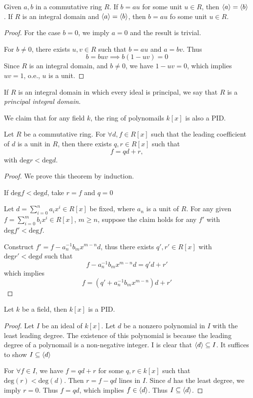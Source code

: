 \begin{proposition}
Given $a,b$ in a commutative ring $R$. If $b=au$ for some unit $u\in R$, then $\langle a\rangle=\langle b\rangle$. If $R$ is an integral domain and $\langle a\rangle=\langle b\rangle$, then $b=au$ fo some unit $u\in R$. 
\end{proposition}
\begin{proof}
For the case $b=0$, we imply $a=0$ and the result is trivial.

For $b\ne0$, there exists $u,v\in R$ such that $b=au$ and $a=bv$. Thus
\[
b=buv\implies b(1-uv)=0
\]
Since $R$ is an integral domain, and $b\ne0$, we have $1-uv=0$, which implies $uv=1$, o.e., $u$ is a unit.
\end{proof}

\begin{definition}[PID]
If $R$ is an integral domain in which every ideal is principal, we say that $R$ is a \emph{principal integral domain}.
\end{definition}
We claim that for any field $k$, the ring of polynomails $k[x]$ is also a PID.
\begin{proposition}
Let $R$ be a commutative ring. For $\forall d,f\in R[x]$ such that the leading coefficient of $d$ is a unit in $R$, then there exists $q,r\in R[x]$ such that
\[
f=qd+r,
\]
with $\mbox{deg} r<\mbox{deg} d$.
\end{proposition}
\begin{proof}
We prove this theorem by induction.

If $\mbox{deg} f<\mbox{deg} d$, take $r=f$ and $q=0$

Let $d=\sum_{i=0}^na_ix^i\in R[x]$ be fixed, where $a_n$ is a unit of $R$. For any given $f=\sum_{i=0}^mb_ix^i\in R[x]$, $m\ge n$, suppose the claim holds for any $f'$ with $\mbox{deg}f'<\mbox{deg}f$.

Construct $f'=f - a_n^{-1}b_mx^{m-n}d$, thus there exists $q',r'\in R[x]$ with $\mbox{deg}r'<\mbox{deg}d$ such that
\[
f - a_n^{-1}b_mx^{m-n}d = q'd+r'
\]
which implies 
\[
f = (q'+a_n^{-1}b_mx^{m-n})d+r'
\]
\end{proof}
\begin{theorem}
Let $k$ be a field, then $k[x]$ is a PID.
\end{theorem}
\begin{proof}
Let $I$ be an ideal of $k[x]$. Let $d$ be a nonzero polynomial in $I$ with the least leading degree. The existence of this polynomial is because the leading degree of a polynomail is a non-negative integer. I is clear that $\langle d\rangle\subseteq I$. It suffices to show $I\subseteq\langle d\rangle$

For $\forall f\in I$, we have $f=qd+r$ for some $q,r\in k[x]$ such that $\mbox{deg}(r)<\mbox{deg}(d)$. Then $r=f-qd$ lines in $I$. Since $d$ has the least degree, we imply $r=0$. Thus $f=qd$, which implies $f\in\langle d\rangle$. Thus $I\subseteq\langle d\rangle$.
\end{proof}

